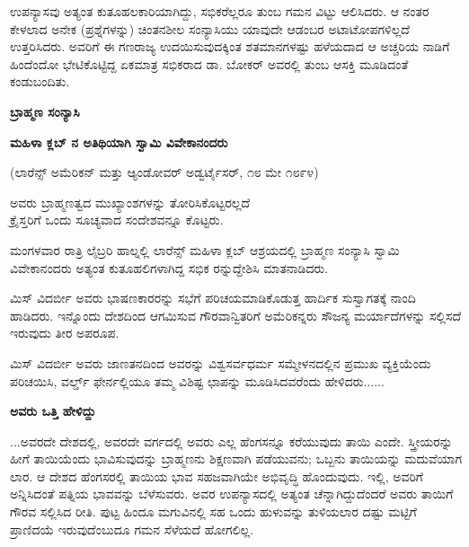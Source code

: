 ಉಪನ್ಯಾಸವು ಅತ್ಯಂತ ಕುತೂಹಲಕಾರಿಯಾಗಿದ್ದು, ಸಭಿಕರೆಲ್ಲರೂ ತುಂಬ ಗಮನ ವಿಟ್ಟು ಆಲಿಸಿದರು. ಆ ನಂತರ ಕೇಳಲಾದ ಅನೇಕ (ಪ್ರಶ್ನೆಗಳನ್ನು) ಚಿಂತನಶೀಲ ಸಂನ್ಯಾಸಿಯು ಯಾವುದೇ ಆಡಂಬರ ಅಟಾಟೋಪಗಳಿಲ್ಲದೆ ಉತ್ತರಿಸಿದರು. ಅವರಿಗೆ ಈ ಗಣರಾಜ್ಯ ಉದಯಿಸುವುದಕ್ಕಿಂತ ಶತಮಾನಗಳಷ್ಟು ಹಳೆಯದಾದ ಆ ಅಚ್ಚರಿಯ ನಾಡಿಗೆ ಹಿಂದೆಂದೋ ಭೇಟಿಕೊಟ್ಟಿದ್ದ ಏಕಮಾತ್ರ ಸಭಿಕರಾದ ಡಾ. ಬೋಕರ್ ಅವರಲ್ಲಿ ತುಂಬ ಆಸಕ್ತಿ ಮೂಡಿದಂತೆ ಕಂಡುಬಂದಿತು.

\begin{center}
\textbf{ಬ್ರಾಹ್ಮಣ ಸಂನ್ಯಾಸಿ}
\end{center}

\begin{center}
\textbf{ಮಹಿಳಾ ಕ್ಲಬ್ ನ ಅತಿಥಿಯಾಗಿ ಸ್ವಾಮಿ ವಿವೇಕಾನಂದರು}
\end{center}

\begin{center}
(ಲಾರೆನ್ಸ್ ಅಮೆರಿಕನ್ ಮತ್ತು ಆ್ಯಂಡೋವರ್ ಅಡ್ವರ್ಟೈಸರ್, ೧೮ ಮೇ ೧೮೯೪)
\end{center}

\begin{center}
ಅವರು ಬ್ರಾಹ್ಮಣತ್ವದ ಮುಖ್ಯಾಂಶಗಳನ್ನು ತೋರಿಸಿಕೊಟ್ಟರಲ್ಲದೆ\\ಕ್ರೈಸ್ತರಿಗೆ ಒಂದು ಸೂಚ್ಯವಾದ ಸಂದೇಶವನ್ನೂ ಕೊಟ್ಟರು.
\end{center}

ಮಂಗಳವಾರ ರಾತ್ರಿ ಲೈಬ್ರರಿ ಹಾಲ್ನಲ್ಲಿ ಲಾರೆನ್ಸ್ ಮಹಿಳಾ ಕ್ಲಬ್ ಆಶ್ರಯದಲ್ಲಿ ಬ್ರಾಹ್ಮಣ ಸಂನ್ಯಾಸಿ ಸ್ವಾಮಿ ವಿವೇಕಾನಂದರು ಅತ್ಯಂತ ಕುತೂಹಲಿಗಳಾಗಿದ್ದ ಸಭಿಕ ರನ್ನುದ್ದೇಶಿಸಿ ಮಾತನಾಡಿದರು.

ಮಿಸ್ ವಿದರ್ಬೀ ಅವರು ಭಾಷಣಕಾರರನ್ನು ಸಭೆಗೆ ಪರಿಚಯಮಾಡಿಕೊಡುತ್ತ ಹಾರ್ದಿಕ ಸುಸ್ವಾಗತಕ್ಕೆ ನಾಂದಿ ಹಾಡಿದರು. ಇನ್ನೊಂದು ದೇಶದಿಂದ ಆಗಮಿಸುವ ಗೌರವಾನ್ವಿತರಿಗೆ ಅಮೆರಿಕನ್ನರು ಸೌಜನ್ಯ ಮರ್ಯಾದೆಗಳನ್ನು ಸಲ್ಲಿಸದೆ ಇರುವುದು ತೀರ ಅಪರೂಪ.

ಮಿಸ್ ವಿದರ್ಬೀ ಅವರು ಜಾಣತನದಿಂದ ಅವರನ್ನು ವಿಶ್ವಸರ್ವಧರ್ಮ ಸಮ್ಮೇಳನದಲ್ಲಿನ ಪ್ರಮುಖ ವ್ಯಕ್ತಿಯೆಂದು ಪರಿಚಯಿಸಿ, ವರ್ಲ್ಡ್ ಫೇರ್ನಲ್ಲಿಯೂ ತಮ್ಮ ವಿಶಿಷ್ಟ ಛಾಪನ್ನು ಮೂಡಿಸಿದವರೆಂದು ಹೇಳಿದರು......

\begin{center}
\textbf{ಅವರು ಒತ್ತಿ ಹೇಳಿದ್ದು}
\end{center}

...ಅವರದೇ ದೇಶದಲ್ಲಿ, ಅವರದೇ ವರ್ಗದಲ್ಲಿ ಅವರು ಎಲ್ಲ ಹೆಂಗಸನ್ನೂ ಕರೆಯುವುದು ತಾಯಿ ಎಂದೇ. ಸ್ತ್ರೀಯರನ್ನು ಹೀಗೆ ತಾಯಿಯೆಂದು ಭಾವಿಸುವುದನ್ನು ಬ್ರಾಹ್ಮಣನು ಶಿಕ್ಷಣವಾಗಿ ಪಡೆಯುವನು; ಒಬ್ಬನು ತಾಯಿಯನ್ನು ಮದುವೆಯಾಗ ಲಾರ. ಆ ದೇಶದ ಹೆಂಗಸರಲ್ಲಿ ತಾಯಿಯ ಭಾವ ಸಹಜವಾಗಿಯೇ ಅಭಿವೃದ್ಧಿ ಹೊಂದುವುದು. ಇಲ್ಲಿ, ಅವರಿಗೆ ಅನ್ನಿಸಿದಂತೆ ಪತ್ನಿಯ ಭಾವವನ್ನು ಬೆಳೆಸುವರು. ಅವರ ಉಪನ್ಯಾಸದಲ್ಲಿ ಅತ್ಯಂತ ಚೆನ್ನಾಗಿದ್ದುದೆಂದರೆ ಅವರು ತಾಯಿಗೆ ಗೌರವ ಸಲ್ಲಿಸಿದ ರೀತಿ. ಪುಟ್ಟ ಹಿಂದೂ ಮಗುವಿನಲ್ಲಿ ಸಹ ಒಂದು ಹುಳುವನ್ನು ತುಳಿಯಲಾರ ದಷ್ಟು ಮಟ್ಟಿಗೆ ಪ್ರಾಣಿದಯೆ ಇರುವುದೆಂಬುದೂ ಗಮನ ಸೆಳೆಯದೆ ಹೋಗಲಿಲ್ಲ.

